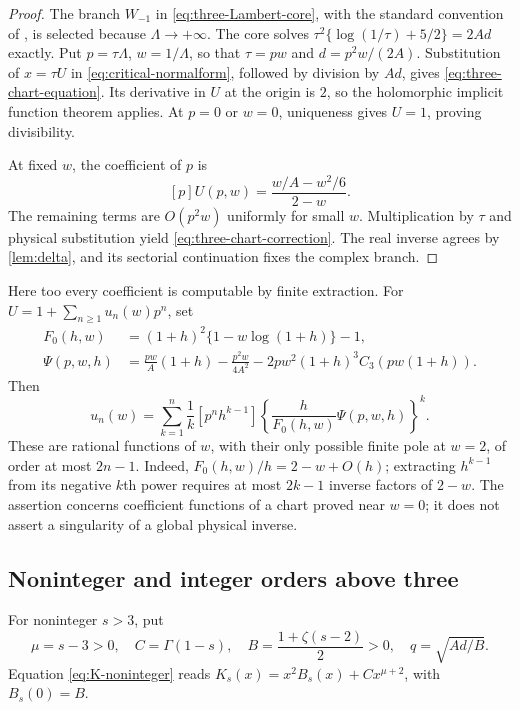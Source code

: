 \begin{proof}
The branch $W_{-1}$ in \eqref{eq:three-Lambert-core}, with the
standard convention of \cite{DLMFLambert}, is selected
because $\Lambda\to+\infty$.  The core solves
$\tau^2\{\log(1/\tau)+5/2\}=2Ad$ exactly.
Put $p=\tau\Lambda$, $w=1/\Lambda$, so that
$\tau=pw$ and $d=p^2w/(2A)$.  Substitution of $x=\tau U$ in
\eqref{eq:critical-normalform}, followed by division by $Ad$,
gives \eqref{eq:three-chart-equation}.  Its derivative in $U$ at
the origin is $2$, so the holomorphic implicit function theorem applies.
At $p=0$ or $w=0$, uniqueness gives $U=1$, proving divisibility.

At fixed $w$, the coefficient of $p$ is
\[
 [p]U(p,w)=\frac{w/A-w^2/6}{2-w}.
\]
The remaining terms are $O(p^2w)$ uniformly for small $w$.
Multiplication by $\tau$ and physical substitution yield
\eqref{eq:three-chart-correction}.  The real inverse agrees by
\cref{lem:delta}, and its sectorial continuation fixes the complex branch.
\end{proof}

Here too every coefficient is computable by finite extraction.
For $U=1+\sum_{n\ge1}u_n(w)p^n$, set
\begin{align*}
 F_0(h,w)&=(1+h)^2\{1-w\log(1+h)\}-1,\\
 \Psi(p,w,h)&=\frac{pw}{A}(1+h)-\frac{p^2w}{4A^2}
 -2pw^2(1+h)^3C_3(pw(1+h)).
\end{align*}
Then
\begin{equation}\label{eq:three-chart-finite}
 u_n(w)=\sum_{k=1}^{n}\frac1k[p^nh^{k-1}]
 \left\{\frac h{F_0(h,w)}\Psi(p,w,h)\right\}^{k}.
\end{equation}
These are rational functions of $w$, with their only possible finite
pole at $w=2$, of order at most $2n-1$.  Indeed,
$F_0(h,w)/h=2-w+O(h)$; extracting $h^{k-1}$ from its negative
$k$th power requires at most $2k-1$ inverse factors of $2-w$.
The assertion concerns coefficient functions of a chart proved near
$w=0$; it does not assert a singularity of a global physical inverse.

\subsection{Noninteger and integer orders above three}

For noninteger $s>3$, put
\[
 \mu=s-3>0,\quad C=\Gamma(1-s),\quad
 B=\frac{1+\zeta(s-2)}2>0,\quad q=\sqrt{Ad/B}.
\]
Equation \eqref{eq:K-noninteger} reads
$K_s(x)=x^2B_s(x)+Cx^{\mu+2}$, with $B_s(0)=B$.

